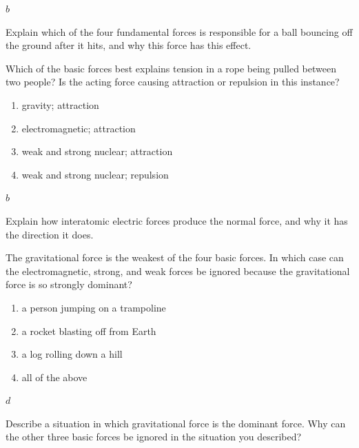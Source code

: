 \documentclass[
]{book}
\providecommand{\tightlist}{%
  \setlength{\itemsep}{0pt}\setlength{\parskip}{0pt}}
\begin{document}
\leavevmode{}%
\(b\)

\hypertarget{fs-id1835056}{}
\leavevmode{}%
Explain which of the four fundamental forces is responsible for a ball
bouncing off the ground after it hits, and why this force has this
effect.

\hypertarget{fs-id1447352}{}
\leavevmode{}%
Which of the basic forces best explains tension in a rope being pulled
between two people? Is the acting force causing attraction or repulsion
in this instance?

\begin{enumerate}
\def\labelenumi{\alph{enumi}.}
\tightlist
\item
  gravity; attraction
\item
  electromagnetic; attraction
\item
  weak and strong nuclear; attraction
\item
  weak and strong nuclear; repulsion
\end{enumerate}

\leavevmode{}%
\(b\)

\hypertarget{fs-id1679830}{}
\leavevmode{}%
Explain how interatomic electric forces produce the normal force, and
why it has the direction it does.

\hypertarget{fs-id1656257}{}
\leavevmode{}%
The gravitational force is the weakest of the four basic forces. In
which case can the electromagnetic, strong, and weak forces be ignored
because the gravitational force is so strongly dominant?

\begin{enumerate}
\def\labelenumi{\alph{enumi}.}
\tightlist
\item
  a person jumping on a trampoline
\item
  a rocket blasting off from Earth
\item
  a log rolling down a hill
\item
  all of the above
\end{enumerate}

\leavevmode{}%
\(d\)

\hypertarget{fs-id1338709}{}
\leavevmode{}%
Describe a situation in which gravitational force is the dominant force.
Why can the other three basic forces be ignored in the situation you
described?
\end{document}
